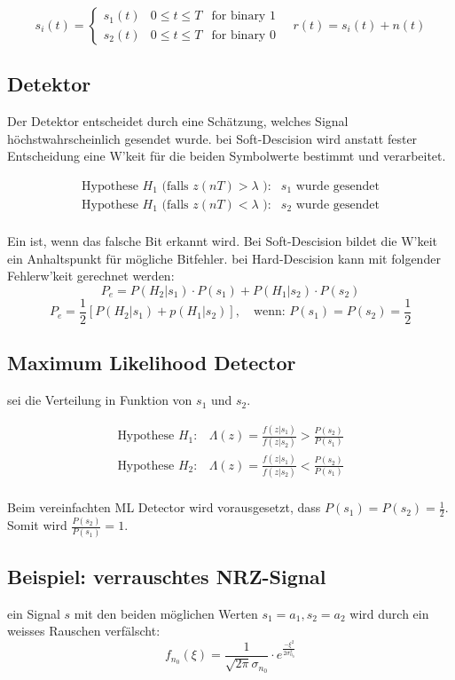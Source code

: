 \documentclass[a4paper]{article}
\begin{document}
\begin{twocolumn}
$$s_i(t) = \left\{ \begin{array}{lll} s_1(t) & 0 \leq t \leq T & \text{for binary 1} \\ 
s_2(t) & 0 \leq t \leq T & \text{for binary 0}\end{array} \right. \quad r(t) = s_i(t) + n(t)$$

\subsection{Detektor}
Der Detektor entscheidet durch eine Schätzung, welches Signal höchstwahrscheinlich gesendet wurde.
bei Soft-Descision wird anstatt fester Entscheidung eine W'keit für die beiden Symbolwerte bestimmt
und verarbeitet.

$$\begin{array}{ll}
  \text{Hypothese } H_1 \text{ (falls } z(nT) > \lambda \text{ ):} & s_1 \text{ wurde gesendet} \\
  \text{Hypothese } H_1 \text{ (falls } z(nT) < \lambda \text{ ):} & s_2 \text{ wurde gesendet} \\
\end{array}
$$

Ein  ist, wenn das falsche Bit erkannt wird. Bei Soft-Descision bildet die 
W'keit ein Anhaltspunkt für mögliche Bitfehler. bei Hard-Descision kann mit folgender 
Fehlerw'keit gerechnet werden:
$$P_e = P(H_2 | s_1) \cdot P(s_1) + P(H_1 | s_2) \cdot P(s_2)$$
$$P_e = \frac{1}{2} \left[ P(H_2 | s_1) + p(H_1 | s_2) \right], \quad \text{wenn: } P(s_1) = P(s_2) = \frac{1}{2} $$

\subsection{Maximum Likelihood Detector}

 sei die Verteilung in Funktion von $s_1$ und $s_2$. 

$$\begin{array}{ll}
\text{Hypothese } H_1: & \Lambda(z) = \frac{f(z|s_1)}{f(z|s_2)} > \frac{P(s_2)}{P(s_1)} \\
\text{Hypothese } H_2: & \Lambda(z) = \frac{f(z|s_1)}{f(z|s_2)} < \frac{P(s_2)}{P(s_1)} \\
\end{array}$$

Beim vereinfachten ML Detector wird vorausgesetzt, dass $P(s_1) = P(s_2) = \frac{1}{2}$. Somit wird
$\frac{P(s_2)}{P(s_1)} = 1$.

\subsection{Beispiel: verrauschtes NRZ-Signal}
ein Signal $s$ mit den beiden möglichen Werten $s_1 = a_1, s_2 = a_2$ wird durch ein weisses Rauschen 
verfälscht:
$$f_{n_0}(\xi) = \frac{1}{\sqrt{2\pi} \sigma_{n_0}} \cdot e^{\frac{-\xi^2}{2 \sigma_{n_0}^2}} $$


\end{twocolumn}
\end{document}
